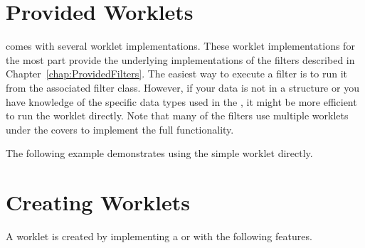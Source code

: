 \begin{description}
\end{description}


\section{Provided Worklets}
\label{sec:ProvidedWorklets}

\VTKm comes with several worklet implementations.
These worklet implementations for the most part provide the underlying implementations of the filters described in Chapter~\ref{chap:ProvidedFilters}.
The easiest way to execute a filter is to run it from the associated filter class.
However, if your data is not in a  structure or you have knowledge of the specific data types used in the , it might be more efficient to run the worklet directly.
Note that many of the filters use multiple worklets under the covers to implement the full functionality.

The following example demonstrates using the simple  worklet directly.



\section{Creating Worklets}
\label{sec:CreatingWorklets}


A worklet is created by implementing a  or
 with the following features.

